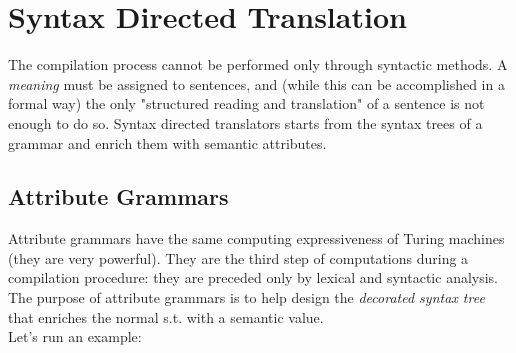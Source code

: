 	\section{Syntax Directed Translation}
	
		The compilation process cannot be performed only through syntactic methods. A \emph{meaning} must be assigned to sentences, and (while this can be accomplished in a formal way) the only "structured reading and translation" of a sentence is not enough to do so. Syntax directed translators starts from the syntax trees of a grammar and enrich them with semantic attributes. 
		
		\subsection{Attribute Grammars}
			Attribute grammars have the same computing expressiveness of Turing machines (they are very powerful). They are the third step of computations during a compilation procedure: they are preceded only by lexical and syntactic analysis. The purpose of attribute grammars is to help design the \emph{decorated syntax tree} that enriches the normal s.t. with a semantic value.\\
			Let's run an example:
			
